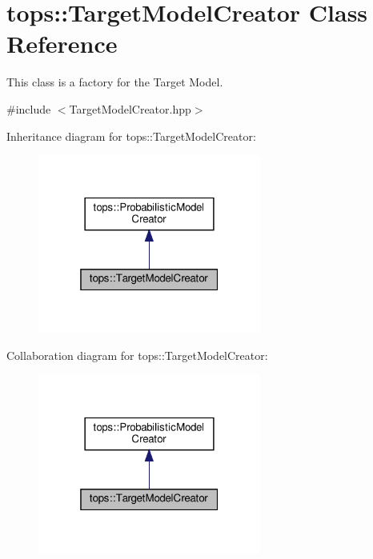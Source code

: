 \hypertarget{classtops_1_1TargetModelCreator}{}\section{tops\+:\+:Target\+Model\+Creator Class Reference}
\label{classtops_1_1TargetModelCreator}


This class is a factory for the Target Model.  




{\ttfamily \#include $<$Target\+Model\+Creator.\+hpp$>$}



Inheritance diagram for tops\+:\+:Target\+Model\+Creator\+:
\nopagebreak
\begin{figure}[H]
\begin{center}
\leavevmode
\includegraphics[width=208pt]{classtops_1_1TargetModelCreator__inherit__graph}
\end{center}
\end{figure}


Collaboration diagram for tops\+:\+:Target\+Model\+Creator\+:
\nopagebreak
\begin{figure}[H]
\begin{center}
\leavevmode
\includegraphics[width=208pt]{classtops_1_1TargetModelCreator__coll__graph}
\end{center}
\end{figure}
